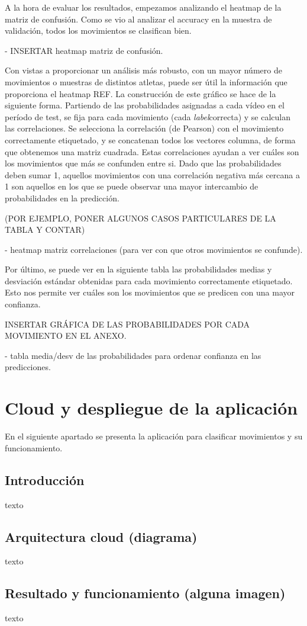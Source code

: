 A la hora de evaluar los resultados, empezamos analizando el heatmap de la matriz de confusión. Como se vio al analizar el accuracy en la muestra de validación, todos los movimientos se clasifican bien.

- INSERTAR heatmap matriz de confusión.

Con vistas a proporcionar un análisis más robusto, con un mayor número de movimientos o muestras de distintos atletas, puede ser útil la información que proporciona el heatmap REF. La construcción de este gráfico se hace de la siguiente forma. Partiendo de las probabilidades asignadas a cada vídeo en el período de test, se fija para cada movimiento (cada \textit{label}correcta) y se calculan las correlaciones. Se selecciona la correlación  (de Pearson) con el movimiento correctamente etiquetado, y se concatenan todos los vectores columna, de forma que obtenemos una matriz cuadrada. Estas correlaciones ayudan a ver cuáles son los movimientos que más se confunden entre si. Dado que las probabilidades deben sumar 1, aquellos movimientos con una correlación negativa más cercana a 1 son aquellos en los que se puede observar una mayor intercambio de probabilidades en la predicción.

(POR EJEMPLO, PONER ALGUNOS CASOS PARTICULARES DE LA TABLA Y CONTAR)

- heatmap matriz correlaciones (para ver con que otros movimientos se confunde).

Por último, se puede ver en la siguiente tabla las probabilidades medias y desviación estándar obtenidas para cada movimiento correctamente etiquetado. Esto nos permite ver cuáles son los movimientos que se predicen con una mayor confianza.

INSERTAR GRÁFICA DE LAS PROBABILIDADES POR CADA MOVIMIENTO EN EL ANEXO.

- tabla media/desv de las probabilidades para ordenar confianza en las predicciones.

\section{Cloud y despliegue de la aplicación}

En el siguiente apartado se presenta la aplicación para clasificar movimientos y su funcionamiento.

\subsection{Introducción}

texto

\subsection{Arquitectura cloud (diagrama)}

texto

\subsection{Resultado y funcionamiento (alguna imagen)}

texto
